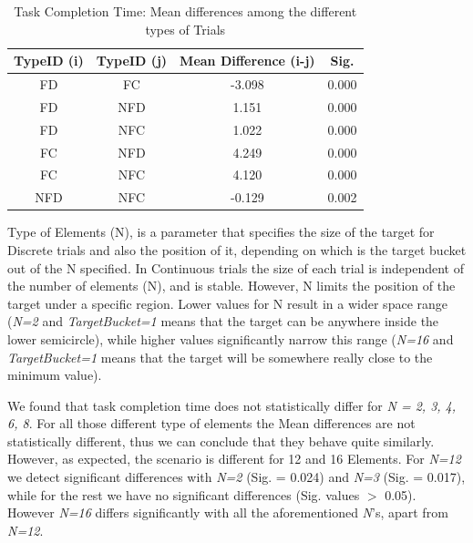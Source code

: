 \begin{table}[H]
\centering
\begin{tabular}{c | c | c | c}
TypeID (i) & TypeID (j) & Mean Difference (i-j) & Sig. \\
\hline \hline
FD      &   FC      &   -3.098      & 0.000 \\
FD      &   NFD     &   1.151       & 0.000 \\
FD      &   NFC     &   1.022       & 0.000 \\
FC      &   NFD     &   4.249       & 0.000 \\
FC      &   NFC     &   4.120       & 0.000 \\
NFD     &   NFC     &   -0.129      & 0.002
\end{tabular}
\caption{Task Completion Time: Mean differences among the different types of Trials}
\label{tab:totaTimeAnova}
\end{table}

Type of Elements (N), is a parameter that specifies the size of the target for Discrete trials and also the position of it, depending on which is the target bucket out of the N specified. In Continuous trials the size of each trial is independent of the number of elements (N), and is stable. However, N limits the position of the target under a specific region. 
Lower values for N result in a wider space range (\emph{N=2} and \emph{TargetBucket=1} means that the target can be anywhere inside the lower semicircle), while higher values significantly narrow this range (\emph{N=16} and \emph{TargetBucket=1} means that the target will be somewhere really close to the minimum value).

We found that task completion time does not statistically differ for \emph{N = 2, 3, 4, 6, 8}. For all those different type of elements the Mean differences are not statistically different, thus we can conclude that they behave quite similarly. However, as expected, the scenario is different for 12 and 16 Elements. For \emph{N=12} we detect significant differences with \emph{N=2} (Sig. = 0.024) and \emph{N=3} (Sig. = 0.017), while for the rest we have no significant differences (Sig. values $>$ 0.05). However \emph{N=16} differs significantly with all the aforementioned \emph{N}'s, apart from \emph{N=12}. 

